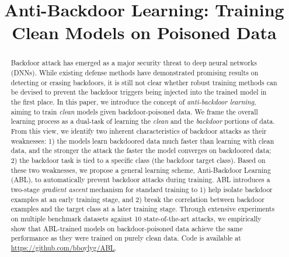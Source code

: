 \title{Anti-Backdoor Learning: Training Clean Models on Poisoned Data}



\maketitle
\renewcommand{\thefootnote}{\fnsymbol{footnote}} 

\begin{abstract}
Backdoor attack has emerged as a major security threat to deep neural networks (DNNs). While existing defense methods have demonstrated promising results on detecting or erasing backdoors, it is still not clear whether robust training methods can be devised to prevent the backdoor triggers being injected into the trained model in the first place.
In this paper, we introduce the concept of \emph{anti-backdoor learning}, aiming to train \emph{clean} models given backdoor-poisoned data. We frame the overall learning process as a dual-task of learning the \emph{clean} and the \emph{backdoor} portions of data. From this view, we identify two inherent characteristics of backdoor attacks as their weaknesses: 1) the models learn backdoored data much faster than learning with clean data, and the stronger the attack the faster the model converges on backdoored data; 2) the backdoor task is tied to a specific class (the backdoor target class). Based on these two weaknesses, we propose a general learning scheme, Anti-Backdoor Learning (ABL), to automatically prevent backdoor attacks during training. ABL introduces a two-stage \emph{gradient ascent} mechanism for standard training to 1) help isolate backdoor examples at an early training stage, and 2) break the correlation between backdoor examples and the target class at a later training stage. Through extensive experiments on multiple benchmark datasets against 10 state-of-the-art attacks, we empirically show that ABL-trained models on backdoor-poisoned data achieve the same performance as they were trained on purely clean data. Code is available at \url{https://github.com/bboylyg/ABL}.

\end{abstract}

